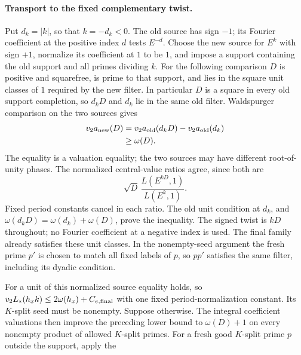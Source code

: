 \paragraph{Transport to the fixed complementary twist.}
Put $d_k=|k|$, so that $k=-d_k<0$. The old source has sign $-1$;
its Fourier coefficient at the positive index $d$ tests $E^{-d}$.
Choose the new source for $E^k$ with sign $+1$, normalize its
coefficient at $1$ to be $1$, and impose a support containing the
old support and all primes dividing $k$. For the following comparison
$D$ is positive and squarefree, is prime to that support, and lies
in the square unit classes of $1$ required by the new filter.
In particular $D$ is a square in every old support completion, so
$d_kD$ and $d_k$ lie in the same old filter. Waldspurger comparison
on the two sources gives
\[
 \begin{split}
  v_2 a_{\rm new}(D)
    &=v_2 a_{\rm old}(d_kD)-v_2 a_{\rm old}(d_k)\\
    &\ge \omega(D).
 \end{split}
\]
The equality is a valuation equality; the two sources may have
different root-of-unity phases. The normalized central-value ratios
agree, since both are
\[
 \sqrt D\,\frac{L(E^{kD},1)}{L(E^k,1)}.
\]
Fixed period constants cancel in each ratio. The old unit condition
at $d_k$, and $\omega(d_kD)=\omega(d_k)+\omega(D)$, prove the
inequality. The signed twist is $kD$ throughout; no Fourier
coefficient at a negative index is used. The final family already
satisfies these unit classes. In the nonempty-seed argument the
fresh prime $p'$ is chosen to match all fixed labels of $p$, so
$pp'$ satisfies the same filter, including its dyadic condition.

For a unit of this normalized source equality holds, so
$v_2L_*(h_xk)\le2\omega(h_x)+C_{e,\rm final}$ with one fixed
period-normalization constant.
Its $K$-split seed must be nonempty. Suppose otherwise. The integral
coefficient valuations then improve the preceding lower bound to
$\omega(D)+1$ on every nonempty product of allowed $K$-split primes.
For a fresh good $K$-split prime $p$ outside the support, apply the
